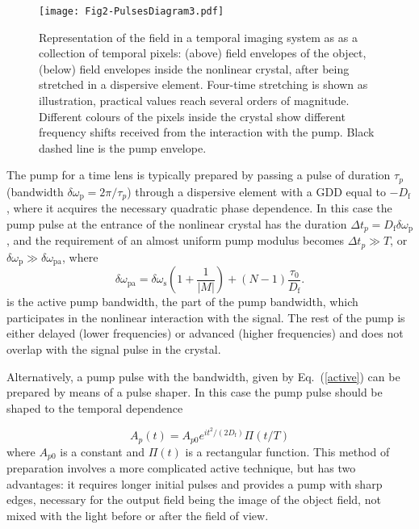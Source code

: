 \documentclass[10pt,twocolumn]{article}
\begin{document}
\begin{figure}[t!]
\centering
\texttt{[image: Fig2-PulsesDiagram3.pdf]}
\caption{Representation of the field in a temporal imaging system as as a collection of temporal pixels: (above) field envelopes of the object, (below) field envelopes inside the nonlinear crystal, after being stretched in a dispersive element. Four-time stretching is shown as illustration, practical values reach several orders of magnitude. Different colours of the pixels inside the crystal show different frequency shifts received from the interaction with the pump. Black dashed line is the pump envelope.}
\label{fig:Pulses}
\end{figure}

The pump for a time lens is typically prepared by passing a pulse of duration $\tau_p$ (bandwidth $\delta\omega_{\mathrm{p}}=2\pi/\tau_p$) through a dispersive element with a GDD equal to $-D_{\mathrm{f}}$, where it acquires the necessary quadratic phase dependence. In this case the pump pulse at the entrance of the nonlinear crystal has the duration $\Delta t_p = D_{\mathrm{f}}\delta\omega_{\mathrm{p}}$, and the requirement of an almost uniform pump modulus becomes $\Delta t_p \gg T$, or $\delta\omega_{\mathrm{p}} \gg \delta\omega_{\mathrm{pa}}$, where
\begin{equation}\label{active}
\delta\omega_{\mathrm{pa}} = \delta\omega_{\mathrm{s}}\left(1+\frac1{|M|}\right)+(N-1)\frac{\tau_0}{D_{\mathrm{f}}}.
\end{equation}
is the active pump bandwidth, the part of the pump bandwidth, which participates in the nonlinear interaction with the signal. The rest of the pump is either delayed (lower frequencies) or advanced (higher frequencies) and does not overlap with the signal pulse in the crystal.

Alternatively, a pump pulse with the bandwidth, given by Eq.~(\ref{active}) can be prepared by means of a pulse shaper. In this case the pump pulse should be shaped to the temporal dependence

\begin{equation}\label{Ap}
A_p(t)=A_{p0}e^{it^2/(2D_{\mathrm{f}})}\Pi(t/T)
\end{equation}
where $A_{p0}$ is a constant and $\Pi(t)$ is a rectangular function. This method of preparation involves a more complicated active technique, but has two advantages: it requires longer initial pulses and provides a pump with sharp edges, necessary for the output field being the image of the object field, not mixed with the light before or after the field of view.
\end{document}
